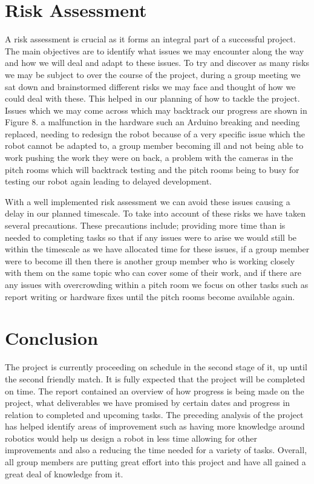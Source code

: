 \documentclass{article}
\begin{document}
\section{Risk Assessment}
A risk assessment is crucial as it forms an integral part of a successful
project. The main objectives are to identify what issues we may encounter along
the way and how we will deal and adapt to these issues. To try and discover as
many risks we may be subject to over the course of the project, during a group
meeting we sat down and brainstormed different risks we may face and thought of
how we could deal with these. This helped in our planning of how to tackle the
project. Issues which we may come across which may backtrack our progress are
shown in Figure 8. \; a malfunction in the hardware such an Arduino
breaking and needing replaced, needing to redesign the robot because of a very
specific issue which the robot cannot be adapted to, a group member becoming ill
and not being able to work pushing the work they were on back, a problem with
the cameras in the pitch rooms which will backtrack testing and the pitch rooms
being to busy for testing our robot again leading to delayed development.

With a well implemented risk assessment we can avoid these issues causing a
delay in our planned timescale. To take into account of these risks we have
taken several precautions. These precautions include; providing more time than
is needed to completing tasks so that if any issues were to arise we would still
be within the timescale as we have allocated time for these issues, if a group
member were to become ill then there is another group member who is working
closely with them on the same topic who can cover some of their work, and if
there are any issues with overcrowding within a pitch room we focus on other
tasks such as report writing or hardware fixes until the pitch rooms become
available again.

\section{Conclusion}
The project is currently proceeding on schedule in the second stage of it, up
until the second friendly match. It is fully expected that the project will be
completed on time. The report contained an overview of how progress is being
made on the project, what deliverables we have promised by certain dates and
progress in relation to completed and upcoming tasks. The preceding analysis of
the project has helped identify areas of improvement such as having more
knowledge around robotics would help us design a robot in less time allowing for
other improvements and also a reducing the time needed for a variety of tasks.
Overall, all group members are putting great effort into this project and have
all gained a great deal of knowledge from it.
 
\end{document}

